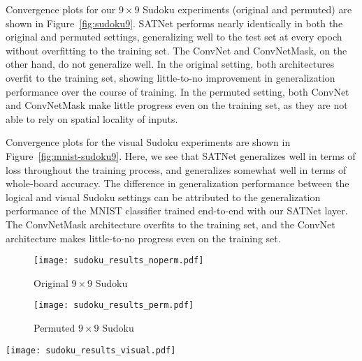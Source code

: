 \documentclass{article}
\begin{document}
    Convergence plots for our $9 \times 9$ Sudoku experiments (original and permuted) are shown in Figure~\ref{fig:sudoku9}. 
    SATNet performs nearly identically in both the original and permuted settings, generalizing well to the test set at every epoch without overfitting to the training set.
    The ConvNet and ConvNetMask, on the other hand, do not generalize well.
    In the original setting, both architectures overfit to the training set, showing little-to-no improvement in generalization performance over the course of training.
    In the permuted setting, both ConvNet and ConvNetMask make little progress even on the training set, as they are not able to rely on spatial locality of inputs.
    
    Convergence plots for the visual Sudoku experiments are shown in Figure~\ref{fig:mnist-sudoku9}.
    Here, we see that SATNet generalizes well in terms of loss throughout the training process, and generalizes somewhat well in terms of whole-board accuracy. 
    The difference in generalization performance between the logical and visual Sudoku settings can be attributed to the generalization performance of the MNIST classifier trained end-to-end with our SATNet layer.
    The ConvNetMask architecture overfits to the training set, and the ConvNet architecture makes little-to-no progress even on the training set.  


    
    
    








\begin{figure*}[htb]
	\centering
	\begin{subfigure}{\textwidth}
	\texttt{[image: sudoku\_results\_noperm.pdf]}
	\caption{Original $9 \times 9$ Sudoku}
	\end{subfigure}
	\par\bigskip


    \begin{subfigure}{\textwidth}
	\texttt{[image: sudoku\_results\_perm.pdf]}
	\caption{Permuted $9 \times 9$ Sudoku}
	\end{subfigure}
\caption{Results for our $9 \times 9$ Sudoku experiments. 
		Lower loss (mean NLL loss and mean MSE loss) and higher whole-board accuracy (\% puzzles correct) are better.}	\label{fig:sudoku9}
	\end{figure*}
\par\bigskip
\par\bigskip
\begin{figure*}[htb]
	\centering
	\texttt{[image: sudoku\_results\_visual.pdf]}
	\caption{Results for our visual Sudoku experiments. 
		Lower loss (mean NLL loss and mean MSE loss) and higher whole-board accuracy (\% puzzles correct) are better. The theoretical ``best'' test accuracy plotted is for our specific choice of MNIST classifier architecture.}	\label{fig:mnist-sudoku9}
	\end{figure*}
    
\end{document}
